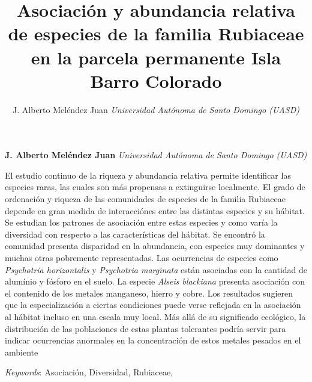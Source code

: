 \documentclass[11pt,]{article}
\title{Asociación y abundancia relativa de especies de la familia Rubiaceae en
la parcela permanente Isla Barro Colorado  }
\author{\Large J. Alberto Meléndez Juan\vspace{0.05in} \newline\normalsize\emph{Universidad Autónoma de Santo Domingo (UASD)}  }
\date{}
\newcommand*{\authorfont}{\fontfamily{phv}\selectfont}
\renewenvironment{abstract}
 {{%
    \setlength{\leftmargin}{0mm}
    \setlength{\rightmargin}{\leftmargin}%
  }%
  \relax}
 {\endlist}
\begin{document}
	
%

{%
\setlength{\parindent}{0pt}
\thispagestyle{plain}
{\fontsize{18}{20}\selectfont\raggedright 
\maketitle  %

}

{
   \vskip 13.5pt\relax \normalsize\fontsize{11}{12} 
\textbf{\authorfont J. Alberto Meléndez Juan} \hskip 15pt \emph{\small Universidad Autónoma de Santo Domingo (UASD)}   

}

}








\begin{abstract}

    \hbox{\vrule height .2pt width 39.14pc}

    \vskip 8.5pt %

\noindent El estudio continuo de la riqueza y abundancia relativa permite
identificar las especies raras, las cuales son más propensas a
extinguirse localmente. El grado de ordenación y riqueza de las
comunidades de especies de la familia Rubiaceae depende en gran medida
de interacciónes entre las distintas especies y su hábitat. Se estudian
los patrones de asociación entre estas especies y como varía la
diversidad con respecto a las características del hábitat. Se encontró
la comunidad presenta disparidad en la abundancia, con especies muy
dominantes y muchas otras pobremente representadas. Las ocurrencias de
especies como \emph{Psychotria horizontalis} y \emph{Psychotria
marginata} están asociadas con la cantidad de alumínio y fósforo en el
suelo. La especie \emph{Alseis blackiana} presenta asociación con el
contenido de los metales manganeso, hierro y cobre. Los resultados
sugieren que la especialización a ciertas condiciones puede verse
reflejada en la asociación al hábitat incluso en una escala muy local.
Más allá de su significado ecológico, la distribución de las poblaciones
de estas plantas tolerantes podría servir para indicar ocurrencias
anormales en la concentración de estos metales pesados en el ambiente


\vskip 8.5pt \noindent \emph{Keywords}: Asociación, Diversidad, Rubiaceae, \par

    \hbox{\vrule height .2pt width 39.14pc}



\end{abstract}
\end{document}
